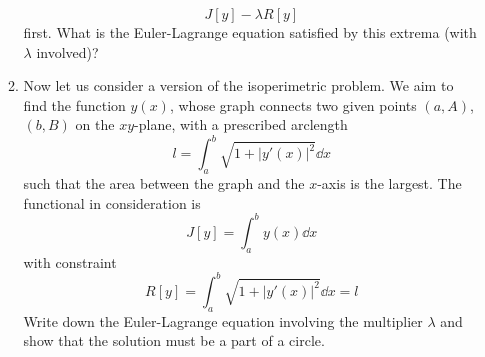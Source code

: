 \documentclass[../psets.tex]{subfiles}
\begin{document}
\begin{enumerate}
\begin{enumerate}
\begin{equation*}
            J[y]-\lambda R[y]
        \end{equation*}
        first. What is the Euler-Lagrange equation satisfied by this extrema (with $\lambda$ involved)?
        \item Now let us consider a version of the isoperimetric problem. We aim to find the function $y(x)$, whose graph connects two given points $(a,A)$, $(b,B)$ on the $xy$-plane, with a prescribed arclength
        \begin{equation*}
            l = \int_a^b\sqrt{1+|y'(x)|^2}\dd{x}
        \end{equation*}
        such that the area between the graph and the $x$-axis is the largest. The functional in consideration is
        \begin{equation*}
            J[y] = \int_a^by(x)\dd{x}
        \end{equation*}
        with constraint
        \begin{equation*}
            R[y] = \int_a^b\sqrt{1+|y'(x)|^2}\dd{x} = l
        \end{equation*}
        Write down the Euler-Lagrange equation involving the multiplier $\lambda$ and show that the solution must be a part of a circle.
    \end{enumerate}
\end{enumerate}
\end{document}
